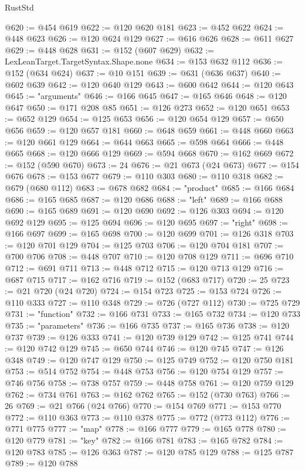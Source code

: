\begin{lexlean}{RustStd}
\begin{coremodule}
@620 := @454 @619
@622 := @120 @620 @181
@623 := @452 @622
@624 := @448 @623
@626 := @120 @624 @129
@627 := @616 @626
@628 := @611 @627
@629 := @448 @628
@631 := @152 (@607 @629)
@632 := LexLeanTarget.TargetSyntax.Shape.none
@634 := @153 @632 @112
@636 := @152 (@634 @624)
@637 := @10 @151
@639 := @631 (@636 @637)
@640 := @602 @639
@642 := @120 @640 @129
@643 := @600 @642
@644 := @120 @643
@645 := "arguments"
@646 := @166 @645
@647 := @165 @646
@648 := @120 @647
@650 := @171 @208 @85
@651 := @126 @273
@652 := @120 @651
@653 := @652 @129
@654 := @125 @653
@656 := @120 @654 @129
@657 := @650 @656
@659 := @120 @657 @181
@660 := @648 @659
@661 := @448 @660
@663 := @120 @661 @129
@664 := @644 @663
@665 := @598 @664
@666 := @448 @665
@668 := @120 @666 @129
@669 := @594 @668
@670 := @162 @669
@672 := @152 (@590 @670)
@673 := 24
@676 := @21 @673 (@24 @673)
@677 := @154 @676
@678 := @153 @677
@679 := @110 @303
@680 := @110 @318
@682 := @679 (@680 @112)
@683 := @678 @682
@684 := "product"
@685 := @166 @684
@686 := @165 @685
@687 := @120 @686
@688 := "left"
@689 := @166 @688
@690 := @165 @689
@691 := @120 @690
@692 := @126 @303
@694 := @120 @692 @129
@695 := @125 @694
@696 := @120 @695
@697 := "right"
@698 := @166 @697
@699 := @165 @698
@700 := @120 @699
@701 := @126 @318
@703 := @120 @701 @129
@704 := @125 @703
@706 := @120 @704 @181
@707 := @700 @706
@708 := @448 @707
@710 := @120 @708 @129
@711 := @696 @710
@712 := @691 @711
@713 := @448 @712
@715 := @120 @713 @129
@716 := @687 @715
@717 := @162 @716
@719 := @152 (@683 @717)
@720 := 25
@723 := @21 @720 (@24 @720)
@724 := @154 @723
@725 := @153 @724
@726 := @110 @333
@727 := @110 @348
@729 := @726 (@727 @112)
@730 := @725 @729
@731 := "function"
@732 := @166 @731
@733 := @165 @732
@734 := @120 @733
@735 := "parameters"
@736 := @166 @735
@737 := @165 @736
@738 := @120 @737
@739 := @126 @333
@741 := @120 @739 @129
@742 := @125 @741
@744 := @120 @742 @129
@745 := @650 @744
@746 := @120 @745
@747 := @126 @348
@749 := @120 @747 @129
@750 := @125 @749
@752 := @120 @750 @181
@753 := @514 @752
@754 := @448 @753
@756 := @120 @754 @129
@757 := @746 @756
@758 := @738 @757
@759 := @448 @758
@761 := @120 @759 @129
@762 := @734 @761
@763 := @162 @762
@765 := @152 (@730 @763)
@766 := 26
@769 := @21 @766 (@24 @766)
@770 := @154 @769
@771 := @153 @770
@772 := @110 @363
@773 := @110 @378
@775 := @772 (@773 @112)
@776 := @771 @775
@777 := "map"
@778 := @166 @777
@779 := @165 @778
@780 := @120 @779
@781 := "key"
@782 := @166 @781
@783 := @165 @782
@784 := @120 @783
@785 := @126 @363
@787 := @120 @785 @129
@788 := @125 @787
@789 := @120 @788

\end{coremodule}
\end{lexlean}
